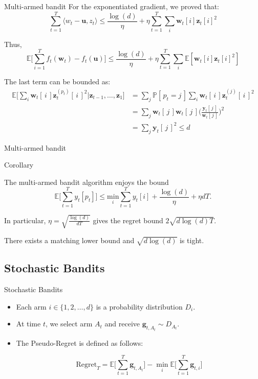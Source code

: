 \documentclass{beamer}
\newcommand{\y}{\mathbf{y}}
\newcommand{\uu}{\mathbf{u}}
\newcommand{\z}{\mathbf{z}}
\newcommand{\w}{\mathbf{w}}
\begin{document}
\begin{frame}{Multi-armed bandit}
For the exponentiated gradient, we proved that:
$$\sum_{t=1}^T  \langle w_t-\uu , z_t \rangle \leq \frac{\log(d)}{\eta}  + \eta \sum_{t=1}^T \sum_i \w_t[i] \z_t[i]^2$$

\pause\vspace{-0.2cm}
Thus,
$$\mathbb{E}\Big[\sum_{i=1}^T f_t(\w_t)- f_t(\uu)\Big] \leq \frac{\log(d)}{\eta}  + \eta \sum_{t=1}^T \sum_i \mathbb{E}[\w_t[i] \z_t[i]^2]$$

\pause

The last term can be bounded as:
\begin{align*}
\mathbb{E}\Big[\sum_i\w_t[\,i\,] \z_t^{(p_t)}[\,i\,]^2 \Big| \z_{t-1}, \hdots, \z_1\Big] &=  \sum_j \mathbb{P}[\,p_t= j\,] \sum_i \w_t[\,i\,] \z_t^{(j)}[\,i\,]^2\\
&=  \sum_j \w_t[\,j\,] \w_t[\,j\,] \Big(\frac{\y_t[\,j\,]}{\w_t[\,j\,]}\Big)^2\\
&= \sum_j \y_t[\,j\,]^2 \leq d
\end{align*}

\end{frame}


\begin{frame}{Multi-armed bandit} 
\begin{block}{Corollary}

The multi-armed bandit algorithm enjoys the bound
$$\mathbb{E}\Big[\sum_{t=1}^T y_t[p_t]\Big] \leq  \underset{i}{\mathrm{min}} \sum_{t=1}^T y_t[i]+ \frac{\log(d)}{\eta}+ \eta dT.$$

In particular, $\eta= \sqrt{\frac{\log(d)}{dT}}$ gives the regret bound $2\sqrt{d\log(d) T}$.


\end{block}



\pause 

There exists a matching lower bound and $\sqrt{d\log(d)}$ is tight.

\end{frame}



\subsection{Stochastic Bandits}
\frame{\subsectionpage}

\begin{frame}{Stochastic Bandits}
\begin{itemize}
\item Each arm $i \in \{1, 2, \dots, d\}$ is a probability distribution $D_i$.
\pause

\item At time $t$, we select arm $A_t$ and receive $\mathbf{g}_{t, A_t} \sim D_{A_t}$.

\pause
\item The Pseudo-Regret is defined as follows:

$$\mathrm{Regret}_T = \mathbb{E}\Big[\sum_{t = 1}^{T}\mathbf{g}_{t, A_t}\Big] - \min_i \mathbb{E}\Big[\sum_{t = 1}^{T}\mathbf{g}_{t, i}\Big]$$
\end{itemize}
\end{frame}
\end{document}
